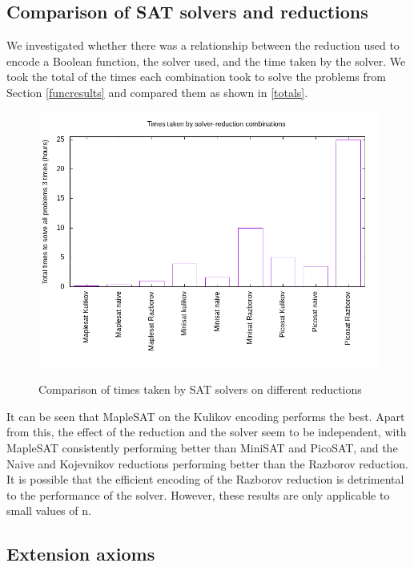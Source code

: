 \documentclass{article}
\begin{document}
\subsection{Comparison of SAT solvers and reductions} \label{satresults}

We investigated whether there was a relationship between the reduction used to encode a Boolean function, the solver used, and the time taken by the solver. We took the total of the times each combination took to solve the problems from Section \ref{funcresults} and compared them as shown in \ref{totals}.

\begin{figure}[!ht]
  \includegraphics[width=\textwidth]{images/totals.png}
  \label{fig:totals}
  \caption{Comparison of times taken by SAT solvers on different reductions}
\end{figure}

It can be seen that MapleSAT on the Kulikov encoding performs the best. Apart from this, the effect of the reduction and the solver seem to be independent, with MapleSAT consistently performing better than MiniSAT and PicoSAT, and the Naive and Kojevnikov reductions performing better than the Razborov reduction. It is possible that the efficient encoding of the Razborov reduction is detrimental to the performance of the solver. However, these results are only applicable to small values of n. 

\subsection{Extension axioms}
\end{document}
